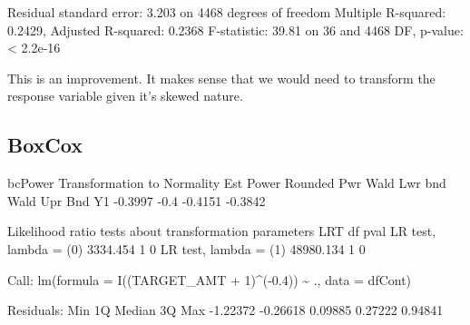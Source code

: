 \documentclass[]{article}
\begin{document}
Residual standard error: 3.203 on 4468 degrees of freedom Multiple
R-squared: 0.2429, Adjusted R-squared: 0.2368 F-statistic: 39.81 on 36
and 4468 DF, p-value: \textless{} 2.2e-16

This is an improvement. It makes sense that we would need to transform
the response variable given it's skewed nature.

\hypertarget{boxcox}{%
\subsection{BoxCox}\label{boxcox}}

bcPower Transformation to Normality Est Power Rounded Pwr Wald Lwr bnd
Wald Upr Bnd Y1 -0.3997 -0.4 -0.4151 -0.3842

Likelihood ratio tests about transformation parameters LRT df pval LR
test, lambda = (0) 3334.454 1 0 LR test, lambda = (1) 48980.134 1 0

Call: lm(formula = I((TARGET\_AMT + 1)\^{}(-0.4)) \textasciitilde{} .,
data = dfCont)

Residuals: Min 1Q Median 3Q Max -1.22372 -0.26618 0.09885 0.27222
0.94841
\end{document}
